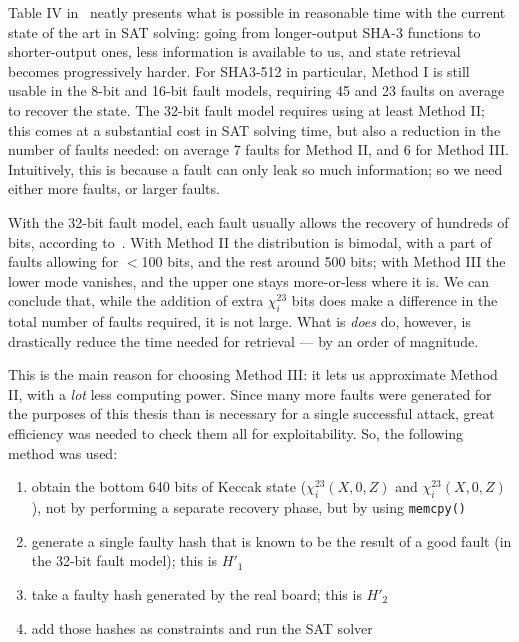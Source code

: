 \documentclass[times, utf8, diplomski]{fer}
\begin{document}
Table IV in~\cite{luo2018algebraic} neatly presents what is possible in
reasonable time with the current state of the art in SAT solving: going from
longer-output SHA-3 functions to shorter-output ones, less information is
available to us, and state retrieval becomes progressively harder.
For SHA3-512 in particular, Method I is still usable in the 8-bit and 16-bit
fault models, requiring 45 and 23 faults on average to recover the state.
The 32-bit fault model requires using at least Method II; this comes at a
substantial cost in SAT solving time, but also a reduction in the number of
faults needed: on average 7 faults for Method II, and 6 for Method III.
Intuitively, this is because a fault can only leak so much information;
so we need either more faults, or larger faults.

With the 32-bit fault model, each fault usually allows the recovery of hundreds
of bits, according to~\cite{luo2018algebraic}. With Method II the distribution
is bimodal, with a part of faults allowing for $<$100 bits, and the rest around
500 bits; with Method III the lower mode vanishes, and the upper one stays
more-or-less where it is. We can conclude that, while the addition of extra
$\chi^{23}_i$ bits does make a difference in the total number of faults required,
it is not large. What is \emph{does} do, however, is drastically reduce the time
needed for retrieval --- by an order of magnitude.

This is the main reason for choosing Method III: it lets us approximate Method II,
with a \emph{lot} less computing power.
Since many more faults were generated for the purposes of this thesis than is
necessary for a single successful attack, great efficiency was needed to check
them all for exploitability.
So, the following method was used:
\begin{enumerate}
    \item obtain the bottom 640 bits of Keccak state ($\chi^{23}_i(X,0,Z)$
          and $\chi^{23}_i(X,0,Z)$), not by performing a separate recovery
          phase, but by using \texttt{memcpy()}
    \item generate a single faulty hash that is known to be the result of a
          good fault (in the 32-bit fault model); this is $H'_1$
    \item take a faulty hash generated by the real board; this is $H'_2$
    \item add those hashes as constraints and run the SAT solver
\end{enumerate}
\end{document}
